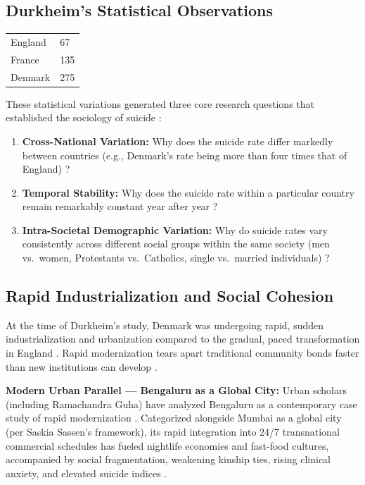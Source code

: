 \subsection{Durkheim's Statistical Observations}

\begin{table}[htbp]
\centering
\small
\begin{tabularx}{\textwidth}{lY}
\toprule
{}
 &  \\
\midrule
England & 67 \\
France & 135 \\
Denmark & 275 \\
\bottomrule
\end{tabularx}
\end{table}

These statistical variations generated three core research questions that established the sociology of suicide :
\begin{enumerate}
    \item \textbf{Cross-National Variation:} Why does the suicide rate differ markedly between countries (e.g., Denmark's rate being more than four times that of England) ?
    \item \textbf{Temporal Stability:} Why does the suicide rate within a particular country remain remarkably constant year after year ?
    \item \textbf{Intra-Societal Demographic Variation:} Why do suicide rates vary consistently across different social groups within the same society (men vs.\ women, Protestants vs.\ Catholics, single vs.\ married individuals) ?
\end{enumerate}

\subsection{Rapid Industrialization and Social Cohesion}

At the time of Durkheim's study, Denmark was undergoing rapid, sudden industrialization and urbanization compared to the gradual, paced transformation in England . Rapid modernization tears apart traditional community bonds faster than new institutions can develop .

\begin{ExampleBox}
\textbf{Modern Urban Parallel --- Bengaluru as a Global City:}
Urban scholars (including Ramachandra Guha) have analyzed Bengaluru as a contemporary case study of rapid modernization . Categorized alongside Mumbai as a global city (per Saskia Sassen's framework), its rapid integration into 24/7 transnational commercial schedules has fueled nightlife economies and fast-food cultures, accompanied by social fragmentation, weakening kinship ties, rising clinical anxiety, and elevated suicide indices .
\end{ExampleBox}

